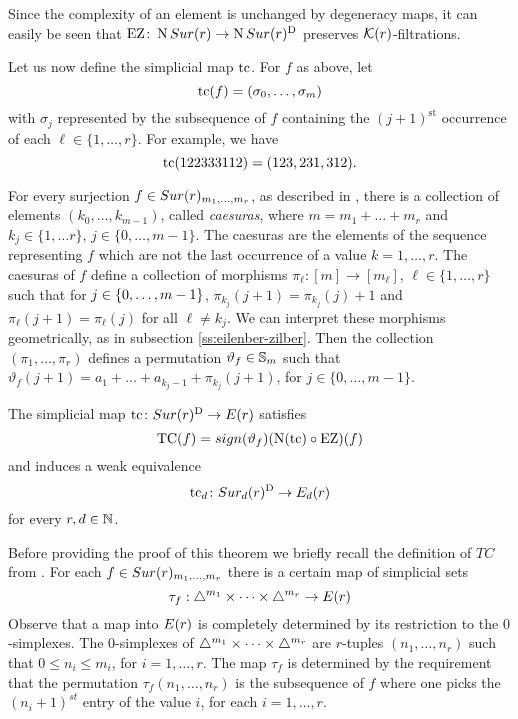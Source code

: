Since the complexity of an element is unchanged by degeneracy maps, it can easily be seen that $\operatorname{EZ} \colon \operatorname{N}Sur(r) \to \operatorname{N}Sur(r)^{\mathrm{D}}$ preserves $\mathcal{K}(r)$-filtrations.

Let us now define the simplicial map $\operatorname{tc}$.
For $f$ as above, let
\[
\operatorname{tc}(f) = (\sigma_0,\dots,\sigma_m)
\]
with $\sigma_j$ represented by the subsequence of $f$ containing the $(j+1)^{\mathrm{st}}$ occurrence of each $\ell \in \{1,\dots,r\}$.
For example, we have
\[
\operatorname{tc}(122333112) = (123,231,312).
\]

For every surjection $f\in Sur(r)_{m_1,\dots,m_r}$, as described in \cite[\S1.2.2]{berger1997confspacemodel}, there is a collection of elements $(k_0 ,\dots , k_{m-1})$, called \textit{caesuras}, where $m=m_1+\dots + m_r$ and $k_j \in \{1,\dots r\}$, $j\in\{0,\dots, m-1\}$. The caesuras are the elements of the sequence representing $f$ which are not the last occurrence of a value $k= 1,\dots, r$. The caesuras of 
 $f$ define a collection of morphisms $\pi_\ell \colon [m] \to [m_\ell]$, $\ell\in\{1,\dots,r\}$ such that for $j \in \{0,\dots,m-1\}$,  $\pi_{k_j}(j+1) = \pi_{k_j}(j)+1$ and $\pi_\ell(j+1) = \pi_\ell(j)$ for all $\ell \neq k_j$. We can interpret these morphisms geometrically, as in subsection \ref{ss:eilenber-zilber}. Then the collection $(\pi_1, \dots, \pi_r)$ defines a permutation $\vartheta_f\in \mathbb{S}_m$ such that $\vartheta_f(j+1)=a_1 +\dots+ a_{k_j -1} + \pi_{k_j}(j+1)$, for $ j\in\{0,\dots, m-1\}$.

\begin{theorem}\label{thm:tc-decomposition}
	The simplicial map $\operatorname{tc} \colon Sur(r)^{\mathrm{D}} \to E(r)$ satisfies
	\[
	\operatorname{TC}(f) = sign(\vartheta_f)(\operatorname{N}(\operatorname{tc}) \circ \operatorname{EZ} )(f)
	\]
	and induces a weak equivalence
	\[
	\operatorname{tc}_d \colon Sur_d(r)^{\mathrm{D}} \to E_d(r)
	\]
	for every $r,d \in \mathbb{N}$.
\end{theorem}

Before providing the proof of this theorem we briefly recall the definition of $TC$ from \cite[]{berger2002prismatic}. For each $f\in Sur(r)_{m_1,\dots,m_r}$ there is a certain map of simplicial sets $$\tau_f:\triangle^{m_1}\times\dots\times\triangle^{m_r}\to E(r)$$ Observe that a map into $E(r)$ is completely determined by its restriction to the $0$-simplexes. The $0$-simplexes of $\triangle^{m_1}\times\dots\times\triangle^{m_r}$ are $r$-tuples 
$(n_1,\dots,n_r)$ such that $0 \leq n_i \leq m_i$,
for $i=1,\dots,r$. The map $\tau_f$ is determined by 
the requirement that the permutation $\tau_f(n_1,\dots,n_r)$ is the subsequence of $f$ where one picks the $(n_i+1)^{st}$ entry of the value $i$, for each $i=1,\dots,r$.

